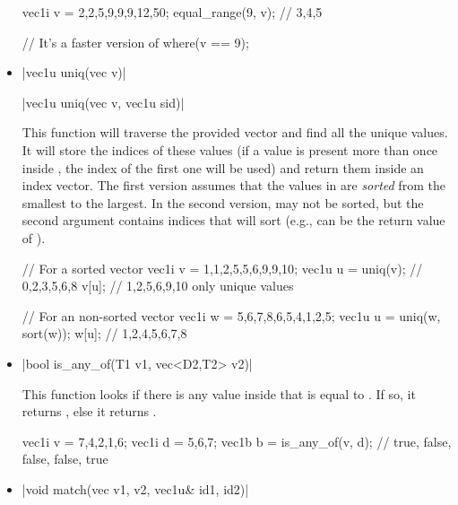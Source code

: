 \documentclass[12pt]{report}
\newcommand*\circled[1]{\tikz[baseline=(char.base)]{
            \node[shape=circle,draw,inner sep=0.0pt] (char) {#1};}}
\newcommand{\vectorfuncsym}{\circled{$\hspace{-1pt}\mathcal{V}$}\xspace}
\newcommand{\vectorfunc}{\vectorfuncsym\hspace{2pt}\xspace}
\newenvironment{example}
{
    \begin{mdframed}[style=example,frametitle={Example}]
}
{
    \end{mdframed}
}
\begin{document}
\begin{itemize}
\begin{example}
\begin{cppcode}
vec1i v = {2,2,5,9,9,9,12,50};
equal_range(9, v); // {3,4,5}

// It's a faster version of
where(v == 9);
\end{cppcode}
\end{example}

\item \cppinline|vec1u uniq(vec v)| 

\cppinline|vec1u uniq(vec v, vec1u sid)|

This function will traverse the provided vector  and find all the unique values. It will store the indices of these values (if a value is present more than once inside , the index of the first one will be used) and return them inside an index vector. The first version assumes that the values in  are \emph{sorted} from the smallest to the largest. In the second version,  may not be sorted, but the second argument  contains indices that will sort  (e.g.,  can be the return value of ).

\begin{example}
\begin{cppcode}
// For a sorted vector
vec1i v = {1,1,2,5,5,6,9,9,10};
vec1u u = uniq(v); // {0,2,3,5,6,8}
v[u]; // {1,2,5,6,9,10} only unique values

// For an non-sorted vector
vec1i w = {5,6,7,8,6,5,4,1,2,5};
vec1u u = uniq(w, sort(w));
w[u]; // {1,2,4,5,6,7,8}
\end{cppcode}
\end{example}

\item \vectorfunc \cppinline|bool is_any_of(T1 v1, vec<D2,T2> v2)| 

This function looks if there is any value inside  that is equal to . If so, it returns , else it returns .

\begin{example}
\begin{cppcode}
vec1i v = {7,4,2,1,6};
vec1i d = {5,6,7};
vec1b b = is_any_of(v, d); // {true, false, false, false, true}
\end{cppcode}
\end{example}

\item \cppinline|void match(vec v1, v2, vec1u& id1, id2)| 


\end{itemize}
\end{document}
